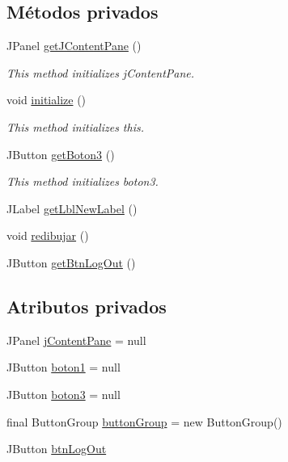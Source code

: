 \subsection*{Métodos privados}
\begin{DoxyCompactItemize}
\item 
J\+Panel \mbox{\hyperlink{classgui_1_1_client_main_g_u_i_a60789fece2ec731726a04b1a48f311c1}{get\+J\+Content\+Pane}} ()
\begin{DoxyCompactList}\small\item\em This method initializes j\+Content\+Pane. \end{DoxyCompactList}\item 
void \mbox{\hyperlink{classgui_1_1_client_main_g_u_i_ab19f9fe8edbfb9df91d264fddd5caecf}{initialize}} ()
\begin{DoxyCompactList}\small\item\em This method initializes this. \end{DoxyCompactList}\item 
J\+Button \mbox{\hyperlink{classgui_1_1_client_main_g_u_i_a45cdcc4e604df9e32eee2aafe21f04f8}{get\+Boton3}} ()
\begin{DoxyCompactList}\small\item\em This method initializes boton3. \end{DoxyCompactList}\item 
J\+Label \mbox{\hyperlink{classgui_1_1_client_main_g_u_i_a1bb69b4ad607b46d8642d215812226df}{get\+Lbl\+New\+Label}} ()
\item 
void \mbox{\hyperlink{classgui_1_1_client_main_g_u_i_a6565ab3c45d2d82aeea189e1b4b23c51}{redibujar}} ()
\item 
J\+Button \mbox{\hyperlink{classgui_1_1_client_main_g_u_i_a314dc209c6b3e908aa9aa22a3fae474d}{get\+Btn\+Log\+Out}} ()
\end{DoxyCompactItemize}
\subsection*{Atributos privados}
\begin{DoxyCompactItemize}
\item 
J\+Panel \mbox{\hyperlink{classgui_1_1_client_main_g_u_i_a27d9ef1b843aeaa940da60efee19d26c}{j\+Content\+Pane}} = null
\item 
J\+Button \mbox{\hyperlink{classgui_1_1_client_main_g_u_i_ab21293a77c7d7632b6e92c8514793448}{boton1}} = null
\item 
J\+Button \mbox{\hyperlink{classgui_1_1_client_main_g_u_i_a220469f9ef90dc199698d1c3789a772e}{boton3}} = null
\item 
final Button\+Group \mbox{\hyperlink{classgui_1_1_client_main_g_u_i_a55bab99544dc2947a28f42cc9f32360e}{button\+Group}} = new Button\+Group()
\item 
J\+Button \mbox{\hyperlink{classgui_1_1_client_main_g_u_i_ac5e8305b963794fa0fe59e49a87e2581}{btn\+Log\+Out}}
\end{DoxyCompactItemize}
